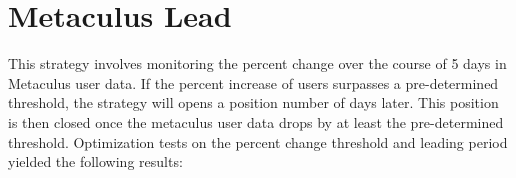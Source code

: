 \documentclass{article}
\begin{document}
\section*{Metaculus Lead}
This strategy involves monitoring the percent change over the course of 5 days in Metaculus user data. If the percent increase of users surpasses a pre-determined threshold, the strategy will opens a position number of days later.  This position is then closed once the metaculus user data drops by at least the pre-determined threshold. Optimization tests on the percent change threshold and leading period yielded the following results:
\end{document}
